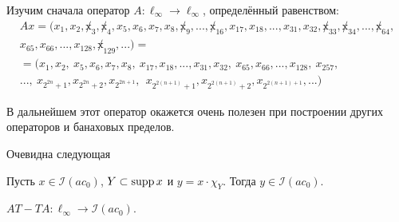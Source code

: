 Изучим сначала оператор $A:\ell_\infty\to\ell_\infty$,
определённый равенством:
\begin{multline}
	\label{eq:oper_A_throws_out_2power_blocks}
	Ax = (x_1, x_2, \not x_3, \not x_4, x_5, x_6, x_7, x_8, \not x_9, ..., \not x_{16}, x_{17}, x_{18}, ..., x_{31}, x_{32}, \not x_{33}, \not x_{34}, ..., \not x_{64},
	\\
	x_{65}, x_{66}, ..., x_{128}, \not x_{129}, ...)=
	\\=
	(x_1, x_2, \ x_5, x_6, x_7, x_8, \ x_{17}, x_{18}, ..., x_{31}, x_{32}, \ x_{65}, x_{66}, ..., x_{128}, \ x_{257},
	\\
	..., \ x_{2^{2n} +1}, x_{2^{2n} +2},  x_{2^{2n+1}}, \ \ x_{2^{2(n+1)} +1},  x_{2^{2(n+1)} +2},  x_{2^{2(n+1)+1}}, ...)
\end{multline}

В дальнейшем этот оператор окажется очень полезен при построении других операторов и банаховых пределов.

Очевидна следующая

\begin{lemma}
	\label{lem:supp_I_ac0}
	Пусть $x\in \mathcal I(ac_0)$, $Y \subset \operatorname{supp} x$ и $y = x \cdot \chi_Y$.
	Тогда $y \in \mathcal I(ac_0)$.
\end{lemma}


\begin{lemma}
	\label{lem:AT-TA}
	$AT - TA: \ell_\infty \to \mathcal{I}(ac_0)$.
\end{lemma}

